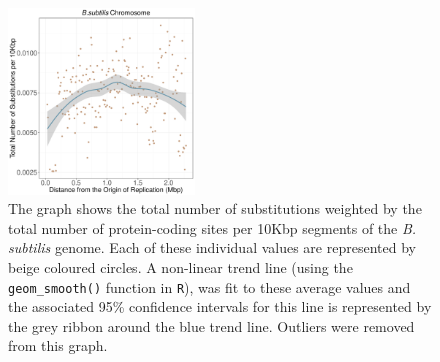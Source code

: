 \documentclass[11pt]{article}
\newcommand{\bass}{\textit{B.\,subtilis}\xspace}
\providecommand{\DIFaddbegin}{} %
\providecommand{\DIFdelbegin}{} %
\providecommand{\DIFdelend}{} %
\providecommand{\DIFaddbeginFL}{} %
\providecommand{\DIFaddendFL}{} %
\providecommand{\DIFdelbeginFL}{} %
\providecommand{\DIFdelendFL}{} %
\begin{document}
\DIFdelbegin %
\DIFdelend \DIFaddbegin \begin{figure}[H]
	\DIFaddendFL \begin{center}
		\DIFdelbeginFL %
\DIFdelendFL \DIFaddbeginFL \includegraphics[width=0.44\textwidth]{./figs/bass_10KB_weighted_subs_nonpar_22Sep20.pdf}
		\DIFaddendFL \caption{\label{fig:bass_nonpar}The graph shows the total number of substitutions weighted by the total number of protein-coding sites per 10Kbp segments of the \bass genome. Each of these individual values are represented by beige coloured circles. A non-linear trend line (using the \texttt{geom\_smooth()} function in \texttt{R}), was fit to these average values and the associated 95\% confidence intervals for this line is represented by the grey ribbon around the blue trend line. Outliers were removed from this graph.}
	\end{center}
\end{figure}
\end{document}
